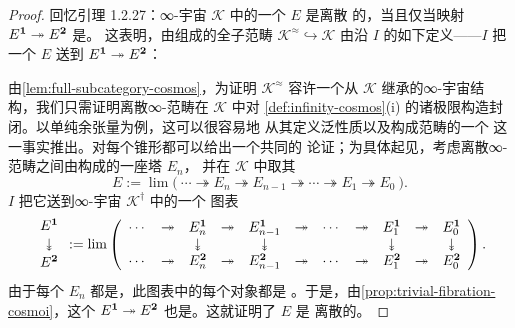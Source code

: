 \begin{proof}
回忆引理 1.2.27：∞-宇宙 $\mathcal{K}$ 中的一个\trInfinityCategory{} $E$ 是离散
的，当且仅当映射 $E^{\mathbf{1}}\twoheadrightarrow E^{\mathbf{2}}$ 是\trTrivialFibration。
这表明，由\trDiscrete{}\trInfinityCategory{}组成的全子范畴
$\mathcal{K}^{\approx}\hookrightarrow\mathcal{K}$ 由沿\trCosmologicalFunctor{}
$I$ 的如下\trPullback{}定义——$I$ 把一个\trInfinityCategory{} $E$ 送到%
\trIsofibration{} $E^{\mathbf{1}}\twoheadrightarrow E^{\mathbf{2}}$：
\begin{center}
\end{center}
由\cref{lem:full-subcategory-cosmos}，为证明 $\mathcal{K}^{\approx}$ 容许一个从
$\mathcal{K}$ 继承的∞-宇宙结构，我们只需证明离散∞-范畴在 $\mathcal{K}$ 中对
\cref{def:infinity-cosmos}(i) 的诸极限构造封闭。以单纯余张量为例，这可以很容易地
从其定义泛性质以及\trKanComplex{}构成\trSimplicialSet{}范畴的一个%
\trExponentialIdeal{}这一事实推出。对每个锥形\trLimit{}都可以给出一个共同的
论证；为具体起见，考虑离散∞-范畴之间由\trIsofibration{}构成的一座塔 $E_{n}$，
并在 $\mathcal{K}$ 中取其\trLimit
\begin{equation*}
E:=\lim\Big(\ \cdots\twoheadrightarrow E_{n}\twoheadrightarrow E_{n-1}
\twoheadrightarrow\cdots\twoheadrightarrow E_{1}\twoheadrightarrow E_{0}\ \Big).
\end{equation*}
\trCosmologicalFunctor{} $I$ 把它送到∞-宇宙 $\mathcal{K}^{\dagger}$ 中的一个%
\trLimit{}图表
\begin{equation*}
\begin{array}{c}
E^{\qcOne}\\[0.1em]
\twoheaddownarrow\\[0.1em]
E^{\qcTwo}
\end{array}
:=\lim\left(\begin{array}{ccccccccccc}
\cdots&\twoheadrightarrow&E_{n}^{\qcOne}&\twoheadrightarrow&E_{n-1}^{\qcOne}
 &\twoheadrightarrow&\cdots&\twoheadrightarrow&E_{1}^{\qcOne}
 &\twoheadrightarrow&E_{0}^{\qcOne}\\
&&\twoheaddownarrow&&\twoheaddownarrow&&&&\twoheaddownarrow&&\twoheaddownarrow\\
\cdots&\twoheadrightarrow&E_{n}^{\qcTwo}&\twoheadrightarrow&E_{n-1}^{\qcTwo}
 &\twoheadrightarrow&\cdots&\twoheadrightarrow&E_{1}^{\qcTwo}
 &\twoheadrightarrow&E_{0}^{\qcTwo}
\end{array}\right).
\end{equation*}
由于每个 $E_{n}$ 都是\trDiscrete{}\trInfinityCategory，此图表中的每个对象都是%
\trTrivialFibration。于是，由\cref{prop:trivial-fibration-cosmoi}，这个\trLimit{}
$E^{\mathbf{1}}\twoheadrightarrow E^{\mathbf{2}}$ 也是\trTrivialFibration。这就证明了 $E$ 是
离散的。
\end{proof}

